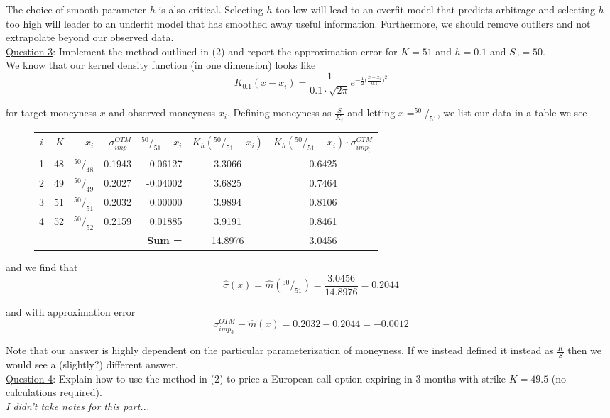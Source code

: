 \documentclass[12pt]{article}
\newlength\tindent
\renewcommand{\indent}{\hspace*{\tindent}}
\begin{document}
\indent The choice of smooth parameter $h$ is also critical. Selecting $h$ too low will lead to an overfit model that predicts arbitrage and selecting $h$ too high will leader to an underfit model that has smoothed away useful information. Furthermore, we should remove outliers and not extrapolate beyond our observed data. \\

\underline{Question 3}: Implement the method outlined in (2) and report the approximation error for $K = 51$ and $h = 0.1$ and $S_0 = 50$. \\

We know that our kernel density function (in one dimension) looks like
\begin{equation*}
	K_{0.1}(x - x_i) = \frac{1}{0.1\cdot\sqrt{2\pi}}e^{-\frac{1}{2}\big(\frac{x - x_i}{0.1}\big)^2}
\end{equation*}

for target moneyness $x$ and observed moneyness $x_i$. Defining moneyness as $\frac{S}{K_i}$ and letting $x = ^{50}/_{51}$, we list our data in a table we see

\begin{figure}[h!]
\centering
\begin{tabular}{c|r|r|r|r|c|c}
	$i$ & $K$ & $x_i$ & $\sigma_{imp}^{OTM}$ & $^{50}/_{51} - x_i$ & $K_h(^{50}/_{51} - x_i)$ & $K_h(^{50}/_{51} - x_i)\cdot \sigma_{imp_{i}}^{OTM}$ \\
	\hline
	1 & 48 & $^{50}/_{48}$ & 0.1943 & -0.06127 & 3.3066 & 0.6425 \\
	2 & 49 & $^{50}/_{49}$ & 0.2027 & -0.04002 & 3.6825 & 0.7464 \\
	3 & 51 & $^{50}/_{51}$ & 0.2032 &  0.00000 & 3.9894 & 0.8106 \\
	4 & 52 & $^{50}/_{52}$ & 0.2159 &  0.01885 & 3.9191 & 0.8461 \\
	\hline
	& & & & {\bf Sum = } & 14.8976 & 3.0456 \\
\end{tabular}
\end{figure}

and we find that
\begin{equation*}
	\hat{\sigma}(x) = \hat{m}(^{50}/_{51}) = \frac{3.0456}{14.8976} = 0.2044
\end{equation*}

and with approximation error
\begin{equation*}
	\sigma_{imp_3}^{OTM} - \hat{m}(x) = 0.2032 - 0.2044 = -0.0012
\end{equation*}

\indent Note that our answer is highly dependent on the particular parameterization of moneyness. If we instead defined it instead as $\frac{K}{S}$ then we would see a (slightly?) different answer. \\

\underline{Question 4}: Explain how to use the method in (2) to price a European call option expiring in 3 months with strike $K = 49.5$ (no calculations required). \\

{\em I didn't take notes for this part...}
\end{document}
